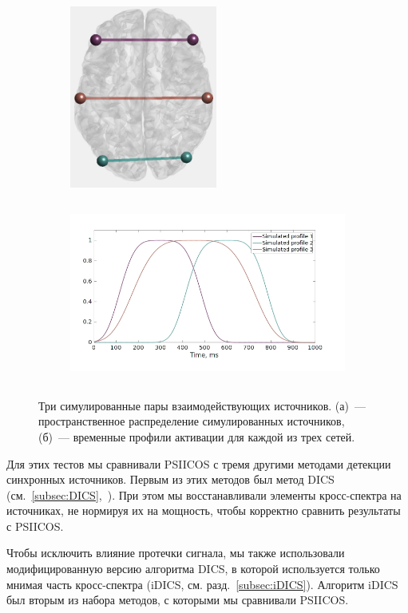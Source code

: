 \begin{figure}[htbp]
    \centering
    \begin{subfigure}[t]{0.5\textwidth}
        \centering
        \includegraphics[angle = 90, height = 6cm]{../images/psiicos_paper/Figure2a_hr.jpg}\label{fig:2a}
        \caption{}
    \end{subfigure}
    \begin{subfigure}[t]{0.5\textwidth}
        \centering
        \includegraphics[height=6cm]{../images/psiicos_paper/Figure2b_hr.jpg}\label{fig:2b}
        \caption{}
    \end{subfigure}
    \caption{Три симулированные пары взаимодействующих источников.
        (а)~--- пространственное распределение симулированных источников,
        (б)~--- временные профили активации для каждой из трех сетей.
    }\label{02}
\end{figure}


Для этих тестов мы сравнивали PSIICOS с тремя другими методами детекции синхронных
источников. Первым из этих методов был метод DICS (см.~\ref{subsec:DICS},~\cite{Gross2001}).
При этом мы восстанавливали элементы кросс-спектра на источниках, не нормируя их
на мощность, чтобы корректно сравнить результаты с PSIICOS.\@

Чтобы исключить влияние протечки сигнала, мы также использовали модифицированную
версию алгоритма DICS, в которой используется только мнимая часть кросс-спектра
(iDICS, см. разд.~\ref{subsec:iDICS}). Алгоритм iDICS был вторым из набора методов, с которыми мы сравнивали
PSIICOS.\@

